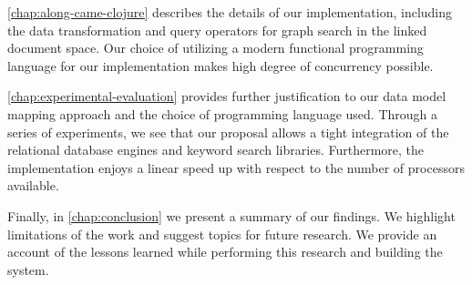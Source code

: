		\cref{chap:along-came-clojure} describes the details of our implementation, including the data transformation and query operators for graph search in the linked document space.  Our choice of utilizing a modern functional programming language for our implementation makes high degree of concurrency possible.
		
		\cref{chap:experimental-evaluation} provides further justification to our data model mapping approach and the choice of programming language used.  Through a series of experiments, we see that our proposal allows a tight integration of the relational database engines and keyword search libraries.  Furthermore, the implementation enjoys a linear speed up with respect to the number of processors available.
		
		Finally, in \cref{chap:conclusion} we present a summary of our findings.  We highlight limitations of the work and suggest topics for future research.  We provide an account of the lessons learned while performing this research and building the system.